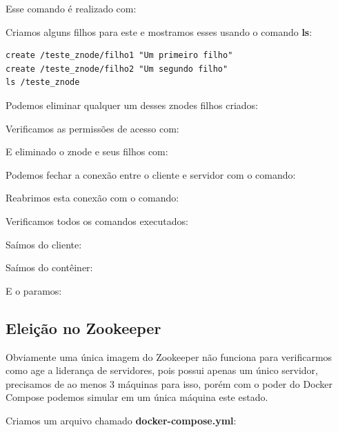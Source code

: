 \documentclass[a4paper,11pt]{article}
\begin{document}
Esse comando é realizado com: \\

Criamos alguns filhos para este  e mostramos esses usando o comando \textbf{ls}:

\begin{lstlisting}[]
create /teste_znode/filho1 "Um primeiro filho"
create /teste_znode/filho2 "Um segundo filho"
ls /teste_znode
\end{lstlisting}

Podemos eliminar qualquer um desses znodes filhos criados: \\

Verificamos as permissões de acesso com: \\

E eliminado o znode e seus filhos com: \\

Podemos fechar a conexão entre o cliente e servidor com o comando: \\

Reabrimos esta conexão com o comando: \\

Verificamos todos os comandos executados: \\

Saímos do cliente: \\

Saímos do contêiner: \\

E o paramos: \\

\subsection{Eleição no Zookeeper}
Obviamente uma única imagem do Zookeeper não funciona para verificarmos como age a liderança de servidores, pois possui apenas um único servidor, precisamos de ao menos 3 máquinas para isso, porém com o poder do Docker Compose podemos simular em um única máquina este estado.

Criamos um arquivo chamado \textbf{docker-compose.yml}:
\end{document}
